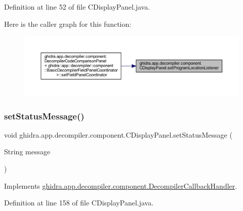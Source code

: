 Definition at line 52 of file C\+Display\+Panel.\+java.

Here is the caller graph for this function\+:
\nopagebreak
\begin{figure}[H]
\begin{center}
\leavevmode
\includegraphics[width=350pt]{classghidra_1_1app_1_1decompiler_1_1component_1_1_c_display_panel_ace727d9df1d16bcf1514aee81db6b007_icgraph}
\end{center}
\end{figure}
\mbox{\label{classghidra_1_1app_1_1decompiler_1_1component_1_1_c_display_panel_a3949006ba655114ced3a014bfb35ed45}} 
\subsubsection{\texorpdfstring{setStatusMessage()}{setStatusMessage()}}
{\footnotesize\ttfamily void ghidra.\+app.\+decompiler.\+component.\+C\+Display\+Panel.\+set\+Status\+Message (\begin{DoxyParamCaption}\item[{String}]{message }\end{DoxyParamCaption})\hspace{0.3cm}{\ttfamily [inline]}}



Implements \mbox{\hyperlink{interfaceghidra_1_1app_1_1decompiler_1_1component_1_1_decompiler_callback_handler_af7aab35a0989733d8f7731a18aa4ea52}{ghidra.\+app.\+decompiler.\+component.\+Decompiler\+Callback\+Handler}}.



Definition at line 158 of file C\+Display\+Panel.\+java.

\mbox{\label{classghidra_1_1app_1_1decompiler_1_1component_1_1_c_display_panel_ad26f7df44bd4a50e2d6fe3c3251e667f}} 
